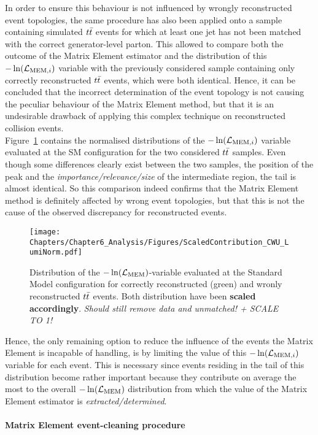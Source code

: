In order to ensure this behaviour is not influenced by wrongly reconstructed event topologies, the same procedure has also been applied onto a sample containing simulated $t\bar{t}$ events for which at least one jet has not been matched with the correct generator-level parton.
This allowed to compare both the outcome of the Matrix Element estimator and the distribution of this $-\ln(\mathcal{L}_{\textrm{MEM}, i})$ variable with the previously considered sample containing only correctly reconstructed $t\bar{t}$ events, which were both identical.
Hence, it can be concluded that the incorrect determination of the event topology is not causing the peculiar behaviour of the Matrix Element method, but that it is an undesirable drawback of applying this complex technique on reconstructed collision events.
\\
Figure~\ref{fig::SMLikCorrVSWr} contains the normalised distributions of the $-\ln(\mathcal{L}_{\textrm{MEM}, i})$ variable evaluated at the SM configuration for the two considered $t\bar{t}$ samples.
Even though some differences clearly exist between the two samples, the position of the peak and the \textit{importance/relevance/size} of the intermediate region, the tail is almost identical.
So this comparison indeed confirms that the Matrix Element method is definitely affected by wrong event topologies, but that this is not the cause of the observed discrepancy for reconstructed events.
\\
\begin{figure}[h!t]
 \centering
 \texttt{[image: Chapters/Chapter6\_Analysis/Figures/ScaledContribution\_CWU\_LumiNorm.pdf]}
 \caption{Distribution of the $-\ln(\mathcal{L}_{\textrm{MEM}})$-variable evaluated at the Standard Model configuration for correctly reconstructed (green) and wronly reconstructed $t\bar{t}$ events. Both distribution have been \textbf{scaled accordingly}. \textit{Should still remove data and unmatched! + SCALE TO 1!}} \label{fig::SMLikCorrVSWr}
\end{figure}

Hence, the only remaining option to reduce the influence of the events the Matrix Element is incapable of handling, is by limiting the value of this $-\ln(\mathcal{L}_{\textrm{MEM}, i})$ variable for each event.
This is necessary since events residing in the tail of this distribution become rather important because they contribute on average the most to the overall $-\ln(\mathcal{L}_{\textrm{MEM}})$ distribution from which the value of the Matrix Element estimator is \textit{extracted/determined}.

\paragraph{Matrix Element event-cleaning procedure} \hfill \\

